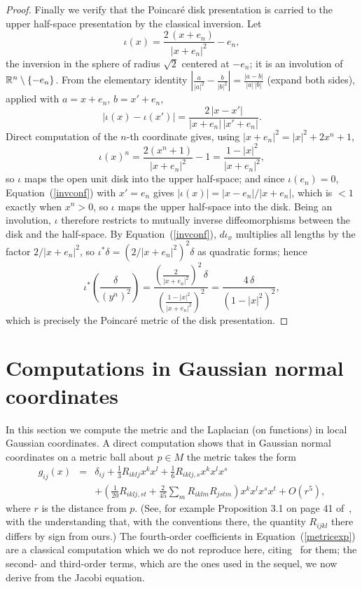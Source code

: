 \begin{proof}
Finally we verify that the Poincar\'e disk presentation is carried
to the upper half-space presentation by the classical inversion.
Let
$$\iota(x)=\frac{2\,(x+e_n)}{|x+e_n|^2}-e_n,$$
the inversion in the sphere of radius $\sqrt2$ centered at $-e_n$;
it is an involution of $\mathbb{R}^n\setminus\{-e_n\}$. From the
elementary identity
$\left|\frac{a}{|a|^2}-\frac{b}{|b|^2}\right|=\frac{|a-b|}{|a|\,|b|}$
(expand both sides), applied with $a=x+e_n$, $b=x'+e_n$,
\begin{equation}\label{invconf}
|\iota(x)-\iota(x')|
=\frac{2\,|x-x'|}{|x+e_n|\,|x'+e_n|}.
\end{equation}
Direct computation of the $n$-th coordinate gives, using
$|x+e_n|^2=|x|^2+2x^n+1$,
$$\iota(x)^n=\frac{2(x^n+1)}{|x+e_n|^2}-1
=\frac{1-|x|^2}{|x+e_n|^2},$$
so $\iota$ maps the open unit disk into the upper half-space; and
since $\iota(e_n)=0$, Equation~(\ref{invconf}) with $x'=e_n$ gives
$|\iota(x)|=|x-e_n|/|x+e_n|$, which is $<1$ exactly when $x^n>0$,
so $\iota$ maps the upper half-space into the disk. Being an
involution, $\iota$ therefore restricts to mutually inverse
diffeomorphisms between the disk and the half-space. By
Equation~(\ref{invconf}), $d\iota_x$ multiplies all lengths by the
factor $2/|x+e_n|^2$, so $\iota^*\delta=
\left(2/|x+e_n|^2\right)^2\delta$ as quadratic forms; hence
$$\iota^*\left(\frac{\delta}{(y^n)^2}\right)
=\frac{\left(\frac{2}{|x+e_n|^2}\right)^2\,\delta}
{\left(\frac{1-|x|^2}{|x+e_n|^2}\right)^2}
=\frac{4\,\delta}{\left(1-|x|^2\right)^2},$$
which is precisely the Poincar\'e metric of the disk presentation.
\end{proof}

\section{Computations in Gaussian normal coordinates}

In this section we compute the metric and the Laplacian (on
functions) in local Gaussian coordinates. A direct computation shows
that in Gaussian normal coordinates on a metric ball about $p\in M$
the metric takes the form
\begin{eqnarray}\label{metricexp}
g_{ij}(x)& = & \delta_{ij} + \frac{1}{3}R_{iklj}x^kx^l +
\frac{1}{6}R_{iklj,s}x^kx^lx^s \\
& & +(\frac{1}{20}R_{iklj,st} +\frac{2}{45}\sum_m
R_{iklm}R_{jstm})x^kx^lx^sx^t + O(r^{5}), \nonumber
\end{eqnarray}
where $r$ is the distance from $p$. (See, for example Proposition
3.1 on page 41 of~\cite{Sakai}, with the understanding that, with
the conventions there, the quantity $R_{ijkl}$ there differs by sign
from ours.) The fourth-order coefficients in
Equation~(\ref{metricexp}) are a classical computation which we do
not reproduce here, citing~\cite{Sakai} for them; the second- and
third-order terms, which are the ones used in the sequel, we now
derive from the Jacobi equation.

